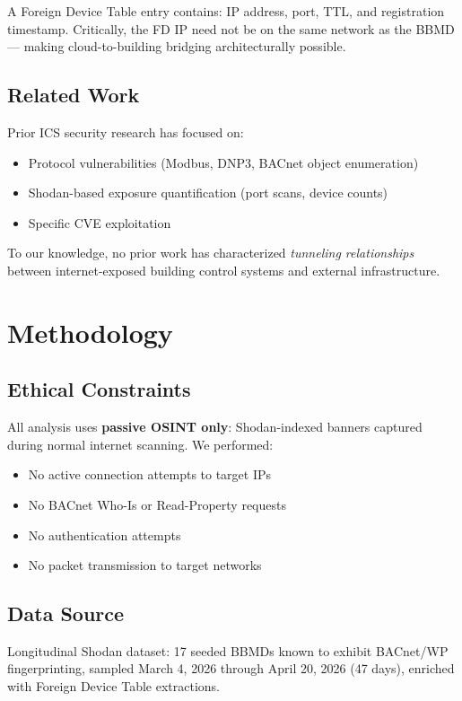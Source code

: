 \documentclass[11pt,a4paper]{article}
\begin{document}
A Foreign Device Table entry contains: IP address, port, TTL, and registration 
timestamp. Critically, the FD IP need not be on the same network as the BBMD---
making cloud-to-building bridging architecturally possible.

\subsection{Related Work}

Prior ICS security research has focused on:
\begin{itemize}
  \item Protocol vulnerabilities (Modbus, DNP3, BACnet object enumeration)
  \item Shodan-based exposure quantification (port scans, device counts)
  \item Specific CVE exploitation
\end{itemize}

To our knowledge, no prior work has characterized \emph{tunneling relationships}
between internet-exposed building control systems and external infrastructure.

\section{Methodology}
\label{sec:methodology}

\subsection{Ethical Constraints}

All analysis uses \textbf{passive OSINT only}: Shodan-indexed banners captured 
during normal internet scanning. We performed:
\begin{itemize}
  \item No active connection attempts to target IPs
  \item No BACnet Who-Is or Read-Property requests
  \item No authentication attempts
  \item No packet transmission to target networks
\end{itemize}

\subsection{Data Source}

Longitudinal Shodan dataset: 17 seeded BBMDs known to exhibit BACnet/WP 
fingerprinting, sampled March 4, 2026 through April 20, 2026 (47 days), 
enriched with Foreign Device Table extractions.
\end{document}
